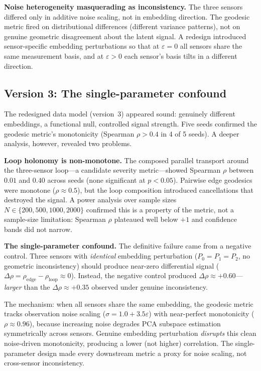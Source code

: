 \documentclass[11pt]{article}
\newcommand{\eps}{\varepsilon}
\begin{document}
\textbf{Noise heterogeneity masquerading as inconsistency.}  The
three sensors differed only in additive noise scaling, not in
embedding direction.  The geodesic metric fired on distributional
differences (different variance patterns), not on genuine geometric
disagreement about the latent signal.  A redesign introduced
sensor-specific embedding perturbations so that at $\eps = 0$ all
sensors share the same measurement basis, and at $\eps > 0$ each
sensor's basis tilts in a different direction.

\subsection{Version 3: The single-parameter confound}
\label{sec:v3}

The redesigned data model (version~3) appeared sound: genuinely
different embeddings, a functional null, controlled signal
strength.  Five seeds confirmed the geodesic metric's monotonicity
(Spearman $\rho > 0.4$ in 4 of 5 seeds).  A deeper analysis,
however, revealed two problems.

\textbf{Loop holonomy is non-monotone.}  The composed parallel
transport around the three-sensor loop---a candidate severity
metric---showed Spearman $\rho$ between $0.01$ and $0.40$ across
seeds (none significant at $p < 0.05$).  Pairwise edge geodesics
were monotone ($\rho \approx 0.5$), but the loop composition
introduced cancellations that destroyed the signal.  A power
analysis over sample sizes $N \in \{200, 500, 1000, 2000\}$
confirmed this is a property of the metric, not a sample-size
limitation: Spearman $\rho$ plateaued well below $+1$ and
confidence bands did not narrow.

\textbf{The single-parameter confound.}  The definitive failure
came from a negative control.  Three sensors with \emph{identical}
embedding perturbation ($P_0 = P_1 = P_2$, no geometric
inconsistency) should produce near-zero differential signal
($\Delta\rho = \rho_\mathrm{edge} - \rho_\mathrm{loop} \approx
0$).  Instead, the negative control produced $\Delta\rho \approx
+0.60$---\emph{larger} than the $\Delta\rho \approx +0.35$
observed under genuine inconsistency.

The mechanism: when all sensors share the same embedding, the
geodesic metric tracks observation noise scaling ($\sigma = 1.0 +
3.5\eps$) with near-perfect monotonicity ($\rho \approx 0.96$),
because increasing noise degrades PCA subspace estimation
symmetrically across sensors.  Genuine embedding perturbation
\emph{disrupts} this clean noise-driven monotonicity, producing a
lower (not higher) correlation.  The single-parameter design made
every downstream metric a proxy for noise scaling, not cross-sensor
inconsistency.
\end{document}
